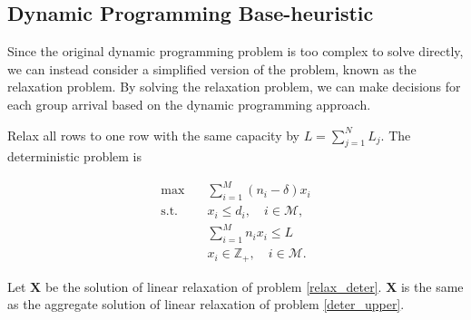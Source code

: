 
\subsection{Dynamic Programming Base-heuristic}
Since the original dynamic programming problem is too complex to solve directly, we can instead consider a simplified version of the problem, known as the relaxation problem. By solving the relaxation problem, we can make decisions for each group arrival based on the dynamic programming approach.

Relax all rows to one row with the same capacity by $L = \sum_{j=1}^{N} L_j$. The deterministic problem is

\begin{equation}\label{relax_deter}
  \begin{aligned}
  \max \quad & \sum_{i=1}^{M} (n_i- \delta) x_{i} \\
  \text {s.t.} \quad & x_{i} \leq d_{i}, \quad i \in \mathcal{M}, \\
  & \sum_{i=1}^{M} n_{i} x_{i} \leq L \\
  & x_{i} \in \mathbb{Z}_{+}, \quad i \in \mathcal{M}.
  \end{aligned}
\end{equation}

\begin{lem}
 Let $\mathbf{X}$ be the solution of linear relaxation of problem \eqref{relax_deter}. $\mathbf{X}$ is the same as the aggregate
 solution of linear relaxation of problem \eqref{deter_upper}.
\end{lem}


